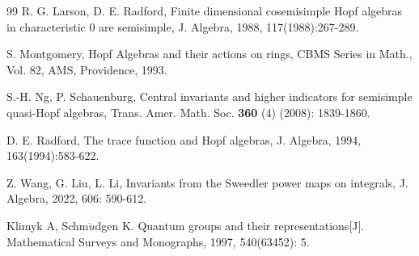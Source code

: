 \documentclass[11pt]{amsart}
\numberwithin{equation}{section}
\begin{document}
\begin{thebibliography}{99}
R. G. Larson, D. E. Radford, Finite dimensional cosemisimple Hopf algebras in characteristic 0 are semisimple, J. Algebra, 1988, 117(1988):267-289.

S. Montgomery, Hopf Algebras and their actions on rings, CBMS Series in Math., Vol. 82, AMS, Providence, 1993.

S.-H. Ng, P. Schauenburg, Central invariants and higher indicators for semisimple quasi-Hopf algebras, Trans. Amer. Math. Soc. {\bf 360} (4) (2008): 1839-1860.

D. E. Radford, The trace function and Hopf algebras, J. Algebra, 1994, 163(1994):583-622.




Z. Wang, G. Liu, L. Li, Invariants from the Sweedler power maps on integrals, J. Algebra, 2022, 606: 590-612.



Klimyk A, Schm$\ddot{u}$dgen K. Quantum groups and their representations[J]. Mathematical Surveys and Monographs, 1997, 540(63452): 5.

\end{thebibliography}
\end{document}
